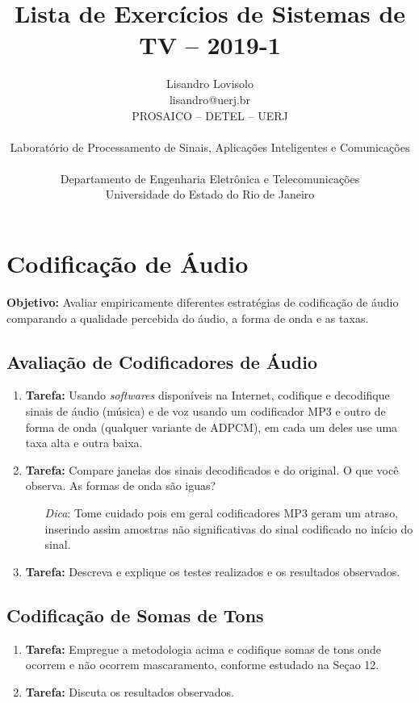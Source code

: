 \documentclass[11pt]{article}
\begin{document}
 

\title{Lista de Exercícios de Sistemas de TV -- 2019-1}
\author{Lisandro Lovisolo \\ lisandro@uerj.br \\ PROSAICO -- DETEL -- UERJ \\ \begin{small} Laboratório de Processamento de Sinais, Aplicações Inteligentes e Comunicações \end{small} \\ Departamento de Engenharia Eletrônica e Telecomunicações \\ Universidade do Estado do Rio de Janeiro}

\maketitle

\section{Codificação de Áudio}

\textbf{Objetivo:} Avaliar empiricamente diferentes estratégias de codificação de áudio comparando a qualidade percebida do áudio, a forma de onda e as taxas.

\subsection{Avaliação de Codificadores de Áudio} 

\begin{enumerate}

\item \textbf{Tarefa:} Usando \emph{softwares} disponíveis na Internet, codifique e decodifique sinais de áudio (música) e de voz usando um codificador MP3 e outro de forma de onda (qualquer variante de ADPCM), em cada um deles use uma taxa alta e outra baixa. 

\item \textbf{Tarefa:} Compare janelas dos sinais decodificados e do original. O que você observa. As formas de onda são iguas? 

\begin{itemize}
\item[\textit{Dica}:] Tome cuidado pois em geral codificadores MP3 geram um atraso, inserindo assim amostras não significativas do sinal codificado no início do sinal.
\end{itemize}

\item \textbf{Tarefa:} Descreva e explique os testes realizados e os resultados observados. 

\end{enumerate}

\subsection{Codificação de Somas de Tons}

\begin{enumerate}
\item \textbf{Tarefa:} Empregue a metodologia acima e codifique somas de tons onde ocorrem e não ocorrem mascaramento, conforme estudado na Seçao 12. 

\item \textbf{Tarefa:} Discuta os resultados observados.
 
\end{enumerate}
\end{document}
